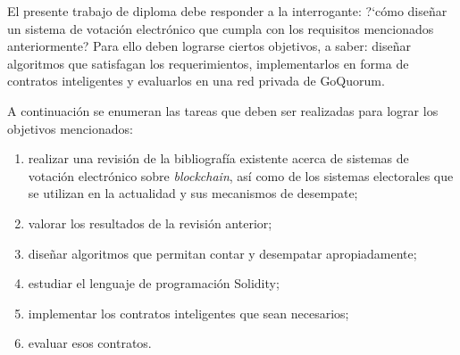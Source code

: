 
El presente trabajo de diploma   debe responder a la interrogante: ?`c\'omo dise\~nar un sistema de votaci\'on electr\'onico que cumpla con los requisitos mencionados anteriormente? Para ello deben lograrse ciertos objetivos, a saber: dise\~nar algoritmos que satisfagan los requerimientos,  implementarlos en forma de contratos inteligentes y evaluarlos en una red privada de GoQuorum.

A continuaci\'on se enumeran las tareas que deben ser realizadas para lograr los objetivos mencionados:
\begin{enumerate}
    \item realizar una revisi\'on de la bibliograf\'ia existente acerca de sistemas de votaci\'on electr\'onico sobre \textit{blockchain}, as\'i como de los sistemas electorales que se utilizan en la actualidad y sus mecanismos de desempate;
    \item valorar los resultados de la revisi\'on anterior;
    \item dise\~nar algoritmos que permitan contar y desempatar apropiadamente;
    \item estudiar el lenguaje de programaci\'on Solidity;
    \item implementar los contratos inteligentes que sean necesarios;
    \item evaluar esos contratos.
\end{enumerate}



